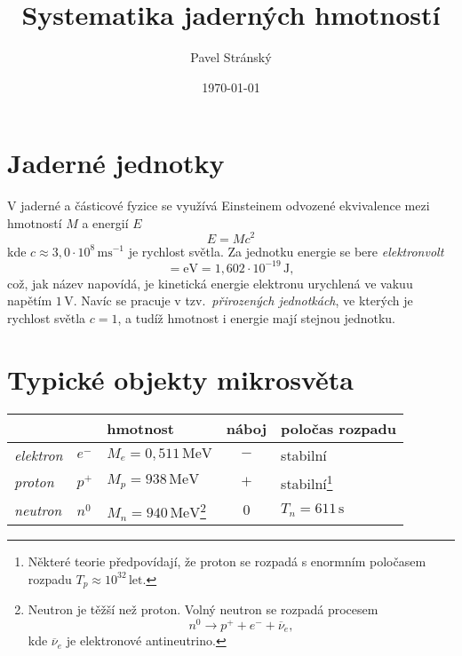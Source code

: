 \documentclass[a4paper,12pt,oneside]{article}
\def\unit#1{\,\mathrm{#1}}
\def\c{,\!}                             %
\theoremstyle{red}
\begin{document}
\title{Systematika jaderných hmotností}
\date{\today}
\author{Pavel Stránský}

\maketitle

\section{Jaderné jednotky}
V jaderné a částicové fyzice se využívá Einsteinem odvozené ekvivalence mezi hmotností $M$ a energií $E$
\begin{equation}
    E=Mc^{2}
\end{equation}
kde $c\approx3\c0\cdot10^8\unit{ms^{-1}}$ je rychlost světla.
Za jednotku energie se bere \emph{elektronvolt}
\begin{equation}
    [E]=\mathrm{eV}=1\c602\cdot10^{-19}\unit{J},
\end{equation}
což, jak název napovídá, je kinetická energie elektronu urychlená ve vakuu napětím $1\,\mathrm{V}$.
Navíc se pracuje v tzv.~\emph{přirozených jednotkách}, ve kterých je rychlost světla $c=1$, a tudíž hmotnost i energie mají stejnou jednotku.

\section{Typické objekty mikrosvěta}
\begin{minipage}{0.95\linewidth}
\begin{tabular}{|l|l|l|c|l|}
    \hline
    & & {\color{red}\bf hmotnost} & náboj & poločas rozpadu \\
    \hline
    \emph{elektron} & $e^{-}$ & $M_{e}=0\c511\unit{MeV}$ & $-$ & stabilní \\
    \emph{proton} & $p^{+}$ & {\color{red}$M_{p}=938\unit{MeV}$} & $+$ & stabilní\footnote{
        Některé teorie předpovídají, že proton se rozpadá s enormním poločasem rozpadu $T_{p}\approx10^{32}\unit{let}$.
        } \\
    \emph{neutron} & $n^{0}$ & {\color{red}$M_{n}=940\unit{MeV}$}\footnote{
        Neutron je těžší než proton. Volný neutron se rozpadá procesem
        \begin{equation}
            \label{eq:beta}
            n^{0}\rightarrow p^{+}+e^{-}+\overline{\nu}_{e},
        \end{equation}
        kde $\overline{\nu}_{e}$ je elektronové antineutrino.
        } & $0$ & $T_{n}=611\unit{s}$ \\
    \hline
\end{tabular}
\end{minipage}
\end{document}
